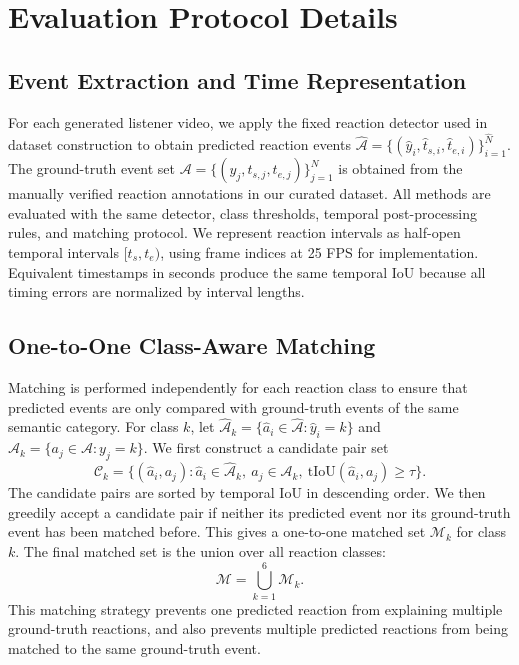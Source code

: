 \section{Evaluation Protocol Details}
\label{app:evaluation_protocol}

\subsection{Event Extraction and Time Representation}
\label{app:event_extraction}

For each generated listener video, we apply the fixed reaction detector used in dataset construction to obtain predicted reaction events $\widehat{\mathcal{A}}=\{(\widehat{y}_i,\widehat{t}_{s,i},\widehat{t}_{e,i})\}_{i=1}^{\widehat{N}}$. The ground-truth event set $\mathcal{A}=\{(y_j,t_{s,j},t_{e,j})\}_{j=1}^{N}$ is obtained from the manually verified reaction annotations in our curated dataset. All methods are evaluated with the same detector, class thresholds, temporal post-processing rules, and matching protocol. We represent reaction intervals as half-open temporal intervals $[t_s,t_e)$, using frame indices at 25 FPS for implementation. Equivalent timestamps in seconds produce the same temporal IoU because all timing errors are normalized by interval lengths.

\subsection{One-to-One Class-Aware Matching}
\label{app:one_to_one_matching}

Matching is performed independently for each reaction class to ensure that predicted events are only compared with ground-truth events of the same semantic category. For class $k$, let $\widehat{\mathcal{A}}_k=\{\widehat{a}_i\in\widehat{\mathcal{A}}:\widehat{y}_i=k\}$ and $\mathcal{A}_k=\{a_j\in\mathcal{A}:y_j=k\}$. We first construct a candidate pair set
\begin{equation}
    \mathcal{C}_k=\{(\widehat{a}_i,a_j):\widehat{a}_i\in\widehat{\mathcal{A}}_k,\ a_j\in\mathcal{A}_k,\ \mathrm{tIoU}(\widehat{a}_i,a_j)\geq\tau\}.
\end{equation}
The candidate pairs are sorted by temporal IoU in descending order. We then greedily accept a candidate pair if neither its predicted event nor its ground-truth event has been matched before. This gives a one-to-one matched set $\mathcal{M}_k$ for class $k$. The final matched set is the union over all reaction classes:
\begin{equation}
    \mathcal{M}=\bigcup_{k=1}^{6}\mathcal{M}_k.
\end{equation}
This matching strategy prevents one predicted reaction from explaining multiple ground-truth reactions, and also prevents multiple predicted reactions from being matched to the same ground-truth event.


